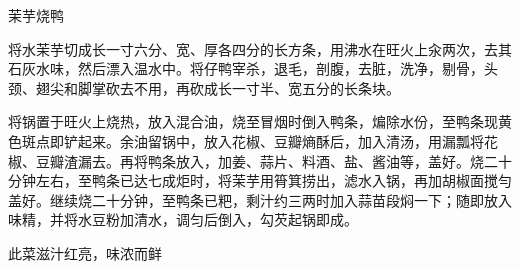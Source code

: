 \begin{recipe}{茉芋烧鸭}

\ingredients




\cooking

\step 将水茉芋切成长一寸六分、宽、厚各四分的长方条，用沸水在旺火上汆两次，去其石灰水味，然后漂入温水中。将仔鸭宰杀，退毛，剖腹，去脏，洗净，剔骨，头颈、翅尖和脚掌砍去不用，再砍成长一寸半、宽五分的长条块。

\step 将锅置于旺火上烧热，放入混合油，烧至冒烟时倒入鸭条，煸除水份，至鸭条现黄色斑点即铲起来。余油留锅中，放入花椒、豆瓣熵酥后，加入清汤，用漏瓢将花椒、豆瓣渣漏去。再将鸭条放入，加姜、蒜片、料酒、盐、酱油等，盖好。烧二十分钟左右，至鸭条已达七成炬时，将茉芋用筲箕捞出，滤水入锅，再加胡椒面搅勻盖好。继续烧二十分钟，至鸭条已粑，剩汁约三两时加入蒜苗段焖一下；随即放入味精，并将水豆粉加清水，调匀后倒入，勾芡起锅即成。

\notes

此菜滋汁红亮，味浓而鲜

\end{recipe}

